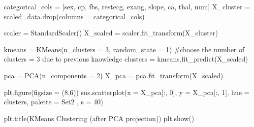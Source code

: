 \documentclass[
  11pt,
  letterpaper,
  DIV=11,
  numbers=noendperiod]{scrartcl}
\newenvironment{Shaded}{\begin{snugshade}}{\end{snugshade}}
\newcommand{\CommentTok}[1]{\textcolor[rgb]{0.37,0.37,0.37}{#1}}
\newcommand{\DecValTok}[1]{\textcolor[rgb]{0.68,0.00,0.00}{#1}}
\newcommand{\NormalTok}[1]{\textcolor[rgb]{0.00,0.23,0.31}{#1}}
\newcommand{\OperatorTok}[1]{\textcolor[rgb]{0.37,0.37,0.37}{#1}}
\newcommand{\StringTok}[1]{\textcolor[rgb]{0.13,0.47,0.30}{#1}}
\begin{document}
\begin{Shaded}
\begin{Highlighting}[]

\NormalTok{categorical\_cols }\OperatorTok{=}\NormalTok{ [}\StringTok{\textquotesingle{}sex\textquotesingle{}}\NormalTok{, }\StringTok{\textquotesingle{}cp\textquotesingle{}}\NormalTok{, }\StringTok{\textquotesingle{}fbs\textquotesingle{}}\NormalTok{, }\StringTok{\textquotesingle{}restecg\textquotesingle{}}\NormalTok{, }\StringTok{\textquotesingle{}exang\textquotesingle{}}\NormalTok{, }\StringTok{\textquotesingle{}slope\textquotesingle{}}\NormalTok{, }\StringTok{\textquotesingle{}ca\textquotesingle{}}\NormalTok{, }\StringTok{\textquotesingle{}thal\textquotesingle{}}\NormalTok{, }\StringTok{\textquotesingle{}num\textquotesingle{}}\NormalTok{]}
\NormalTok{X\_cluster }\OperatorTok{=}\NormalTok{ scaled\_data.drop(columns }\OperatorTok{=}\NormalTok{ categorical\_cols)}

\NormalTok{scaler }\OperatorTok{=}\NormalTok{ StandardScaler()}
\NormalTok{X\_scaled }\OperatorTok{=}\NormalTok{ scaler.fit\_transform(X\_cluster)}


\NormalTok{kmeans }\OperatorTok{=}\NormalTok{ KMeans(n\_clusters }\OperatorTok{=} \DecValTok{3}\NormalTok{, random\_state }\OperatorTok{=} \DecValTok{1}\NormalTok{) }\CommentTok{\#choose the number of clusters = 3 due to previous knowledge}
\NormalTok{clusters }\OperatorTok{=}\NormalTok{ kmeans.fit\_predict(X\_scaled)}

\NormalTok{pca }\OperatorTok{=}\NormalTok{ PCA(n\_components }\OperatorTok{=} \DecValTok{2}\NormalTok{)}
\NormalTok{X\_pca }\OperatorTok{=}\NormalTok{ pca.fit\_transform(X\_scaled)}

\NormalTok{plt.figure(figsize }\OperatorTok{=}\NormalTok{ (}\DecValTok{8}\NormalTok{,}\DecValTok{6}\NormalTok{))}
\NormalTok{sns.scatterplot(x }\OperatorTok{=}\NormalTok{ X\_pca[:, }\DecValTok{0}\NormalTok{], y }\OperatorTok{=}\NormalTok{ X\_pca[:, }\DecValTok{1}\NormalTok{], hue }\OperatorTok{=}\NormalTok{ clusters, palette }\OperatorTok{=} \StringTok{\textquotesingle{}Set2\textquotesingle{}}\NormalTok{ , s }\OperatorTok{=} \DecValTok{40}\NormalTok{)}

\NormalTok{plt.title(}\StringTok{\textquotesingle{}KMeans Clustering (after PCA projection)\textquotesingle{}}\NormalTok{)}
\NormalTok{plt.show()}
\end{Highlighting}
\end{Shaded}
\end{document}
